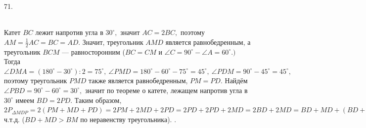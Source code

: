 \documentclass[12pt]{article}
\begin{document}
71. \begin{figure}[ht!]
\end{figure}\\
Катет $BC$ лежит напротив угла в $30^\circ,$ значит $AC=2BC,$ поэтому $AM=\frac{1}{2}AC=BC=AD.$ Значит, треугольник $AMD$ является равнобедренным, а треугольник $BCM$ --- равносторонним ($BC=CM$ и $\angle C=90^\circ-\angle A=60^\circ.)$ Тогда $\angle DMA=(180^\circ-30^\circ):2=75^\circ,\ \angle PMD=180^\circ-60^\circ-75^\circ=45^\circ,\ \angle PDM=90^\circ-45^\circ=45^\circ,$ поэтому треугольник $PMD$ также является равнобедренным, $PM=PD.$ Найдём $\angle PBD=90^\circ-60^\circ=30^\circ,$ значит по теореме о катете, лежащем напротив угла в $30^\circ$ имеем $BD=2PD.$ Таким образом, $2P_{\Delta MDP}=2(PM+MD+PD)=
2PM+2MD+2PD=2PD+2PD+2MD=2BD+2MD=BD+MD+(BD+MD)>BD+MD+BM=P_{\Delta MDB},$ ч.т.д. ($BD+MD>BM$ по неравенству треугольника).\newpage
{}. \begin{figure}[ht!]
\end{figure}\\
\end{document}
